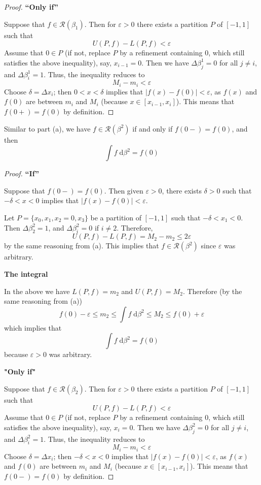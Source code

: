 \documentclass{homework}
\begin{document}
\begin{alphaparts}
\begin{proof}
			\textbf{``Only if''}
			
			Suppose that $f \in \mathscr{R}(\beta_1)$. Then for $\varepsilon >0$ there exists a partition $P$ of $[-1, 1]$ such that
			$$
			U(P, f) - L(P, f) < \varepsilon
			$$
			Assume that $0 \in P$ (if not, replace $P$ by a refinement containing $0$, which still satisfies the above inequality), say, $x_{i-1} = 0$. Then we have $\Delta \beta^1_j = 0$ for all $j \ne i$, and $\Delta \beta^1_i = 1$. Thus, the inequality reduces to
			$$
			M_i - m_i < \varepsilon
			$$
			Choose $\delta = \Delta x_i$; then $0 < x < \delta$ implies that $|f(x) - f(0)| < \varepsilon$, as $f(x)$ and $f(0)$ are between $m_i$ and $M_i$ (because $x \in [x_{i-1},x_i]$). This means that $f(0+) = f(0)$ by definition.
		\end{proof}
		
		\questionpart %
		
		Similar to part (a), we have $f \in \mathscr{R}(\beta^2)$ if and only if $f(0-) = f(0)$, and then
		$$
		\int f \;\text{d}\beta^2 = f(0)
		$$
		\begin{proof}
		   	\textbf{``If''}
			
			Suppose that $f(0-) = f(0)$. Then given $\varepsilon > 0$, there exists $\delta > 0$ such that $-\delta < x < 0$ implies that $|f(x) - f(0)| < \varepsilon$.
			
			Let $P = \{x_0, x_1, x_2=0, x_3\}$ be a partition of $[-1, 1]$ such that $-\delta < x_1 < 0$. Then $\Delta \beta^2_2 = 1$, and $\Delta \beta^2_i = 0$ if $i \ne 2$. Therefore,
			$$
			U(P, f) - L(P, f) = M_2 - m_2 \le 2\varepsilon
			$$
			by the same reasoning from (a). This implies that $f \in \mathscr{R}(\beta^2)$ since $\varepsilon$ was arbitrary.
			
			\textbf{The integral}
			
			In the above we have $L(P,f) = m_2$ and $U(P, f) = M_2$. Therefore (by the same reasoning from (a))
			$$
			f(0) - \varepsilon \le m_2 \le \int f\;\text{d}\beta^2 \le M_2 \le f(0) + \varepsilon
			$$
			which implies that
			$$
			\int f\;\text{d}\beta^2 = f(0)
			$$
			because $\varepsilon>0$ was arbitrary.
			
			\textbf{"Only if"}
			
			Suppose that $f \in \mathscr{R}(\beta_2)$. Then for $\varepsilon >0$ there exists a partition $P$ of $[-1, 1]$ such that
			$$
			U(P, f) - L(P, f) < \varepsilon
			$$
			Assume that $0 \in P$ (if not, replace $P$ by a refinement containing $0$, which still satisfies the above inequality), say, $x_{i} = 0$. Then we have $\Delta \beta^2_j = 0$ for all $j \ne i$, and $\Delta \beta^2_i = 1$. Thus, the inequality reduces to
			$$
			M_i - m_i < \varepsilon
			$$
			Choose $\delta = \Delta x_i$; then $-\delta < x < 0$ implies that $|f(x) - f(0)| < \varepsilon$, as $f(x)$ and $f(0)$ are between $m_i$ and $M_i$ (because $x \in [x_{i-1},x_i]$). This means that $f(0-) = f(0)$ by definition.
		\end{proof}
		

\end{alphaparts}
\end{document}
